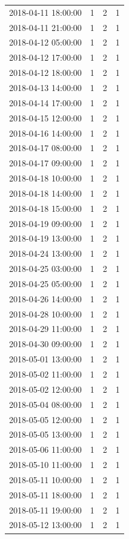 \begin{tabular}{lrrr}
2018-04-11 18:00:00 & 1 & 2 & 1 \\
2018-04-11 21:00:00 & 1 & 2 & 1 \\
2018-04-12 05:00:00 & 1 & 2 & 1 \\
2018-04-12 17:00:00 & 1 & 2 & 1 \\
2018-04-12 18:00:00 & 1 & 2 & 1 \\
2018-04-13 14:00:00 & 1 & 2 & 1 \\
2018-04-14 17:00:00 & 1 & 2 & 1 \\
2018-04-15 12:00:00 & 1 & 2 & 1 \\
2018-04-16 14:00:00 & 1 & 2 & 1 \\
2018-04-17 08:00:00 & 1 & 2 & 1 \\
2018-04-17 09:00:00 & 1 & 2 & 1 \\
2018-04-18 10:00:00 & 1 & 2 & 1 \\
2018-04-18 14:00:00 & 1 & 2 & 1 \\
2018-04-18 15:00:00 & 1 & 2 & 1 \\
2018-04-19 09:00:00 & 1 & 2 & 1 \\
2018-04-19 13:00:00 & 1 & 2 & 1 \\
2018-04-24 13:00:00 & 1 & 2 & 1 \\
2018-04-25 03:00:00 & 1 & 2 & 1 \\
2018-04-25 05:00:00 & 1 & 2 & 1 \\
2018-04-26 14:00:00 & 1 & 2 & 1 \\
2018-04-28 10:00:00 & 1 & 2 & 1 \\
2018-04-29 11:00:00 & 1 & 2 & 1 \\
2018-04-30 09:00:00 & 1 & 2 & 1 \\
2018-05-01 13:00:00 & 1 & 2 & 1 \\
2018-05-02 11:00:00 & 1 & 2 & 1 \\
2018-05-02 12:00:00 & 1 & 2 & 1 \\
2018-05-04 08:00:00 & 1 & 2 & 1 \\
2018-05-05 12:00:00 & 1 & 2 & 1 \\
2018-05-05 13:00:00 & 1 & 2 & 1 \\
2018-05-06 11:00:00 & 1 & 2 & 1 \\
2018-05-10 11:00:00 & 1 & 2 & 1 \\
2018-05-11 10:00:00 & 1 & 2 & 1 \\
2018-05-11 18:00:00 & 1 & 2 & 1 \\
2018-05-11 19:00:00 & 1 & 2 & 1 \\
2018-05-12 13:00:00 & 1 & 2 & 1 \\

\end{tabular}
